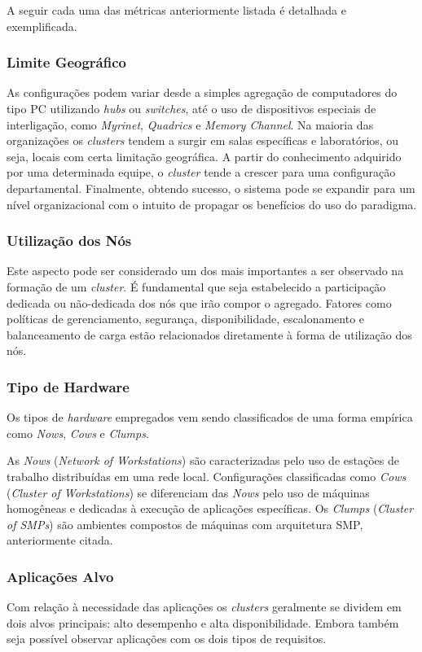 \documentclass[12pt]{report} %
\begin{document}
	    A seguir cada uma das métricas anteriormente listada é detalhada e exemplificada.
	
	    \subsubsection{Limite Geográfico}
		As configurações podem variar desde a simples agregação de computadores do tipo PC utilizando \textit{hubs} ou \textit{switches}, até o uso de dispositivos especiais de interligação, como \textit{Myrinet}, \textit{Quadrics} e \textit{Memory Channel}.
		Na maioria das organizações os \textit{clusters} tendem a surgir em salas específicas e laboratórios, ou seja, locais com certa limitação geográfica.
		A partir do conhecimento adquirido por uma determinada equipe, o \textit{cluster} tende a crescer para uma configuração departamental.
		Finalmente, obtendo sucesso, o sistema pode se expandir para um nível organizacional com o intuito de propagar os benefícios do uso do paradigma.

	    \subsubsection{Utilização dos Nós}
		Este aspecto pode ser considerado um dos mais importantes a ser observado na formação de um \textit{cluster}.
		É fundamental que seja estabelecido a participação dedicada ou não-dedicada dos nós que irão compor o agregado.
		Fatores como políticas de gerenciamento, segurança, disponibilidade, escalonamento e balanceamento de carga estão relacionados diretamente à forma de utilização dos nós.

	    \subsubsection{Tipo de Hardware}
		Os tipos de \textit{hardware} empregados vem sendo classificados de uma forma empírica como \textit{Nows}, \textit{Cows} e \textit{Clumps}.
		
		As \textit{Nows} (\textit{Network of Workstations}) são caracterizadas pelo uso de estações de trabalho distribuídas em uma rede local.
		Configurações classificadas como \textit{Cows} (\textit{Cluster of Workstations}) se diferenciam das \textit{Nows} pelo uso de máquinas homogêneas e dedicadas à execução de aplicações específicas.
		Os \textit{Clumps} (\textit{Cluster of SMPs}) são ambientes compostos de máquinas com arquitetura SMP, anteriormente citada.
	    
	    \subsubsection{Aplicações Alvo}
		Com relação à necessidade das aplicações os \textit{clusters} geralmente se dividem em dois alvos principais: alto desempenho e alta disponibilidade.
		Embora também seja possível observar aplicações com os dois tipos de requisitos.
		
\end{document}
